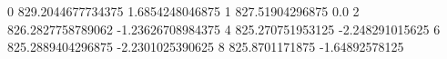 0 829.2044677734375 1.6854248046875
1 827.51904296875 0.0
2 826.2827758789062 -1.23626708984375
4 825.270751953125 -2.248291015625
6 825.2889404296875 -2.2301025390625
8 825.8701171875 -1.64892578125
